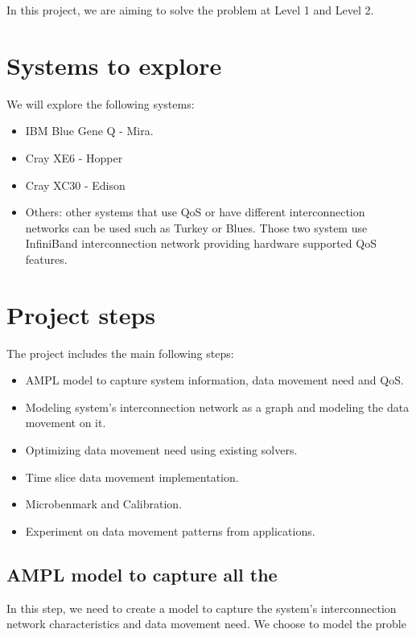 \documentclass[letter]{article}
\begin{document}
In this project, we are aiming to solve the problem at Level 1 and Level 2.

\section {Systems to explore}
We will explore the following systems: 
\begin{itemize}
\item IBM Blue Gene Q - Mira.
\item Cray XE6 - Hopper
\item Cray XC30 - Edison
\item Others: other systems that use QoS or have different interconnection networks can be used such as Turkey or Blues. Those two system use InfiniBand interconnection network providing hardware supported QoS features.
\end{itemize}

\section{Project steps}

The project includes the main following steps:
\begin{itemize}
\item AMPL model to capture system information, data movement need and QoS.
\item Modeling system's interconnection network as a graph and modeling the data movement on it.
\item Optimizing data movement need using existing solvers.
\item Time slice data movement implementation.
\item Microbenmark and Calibration.
\item Experiment on data movement patterns from applications.
\end{itemize}

\subsection {AMPL model to capture all the }
In this step, we need to create a model to capture the system's interconnection network characteristics and data movement need. We choose to model the proble
\end{document}
